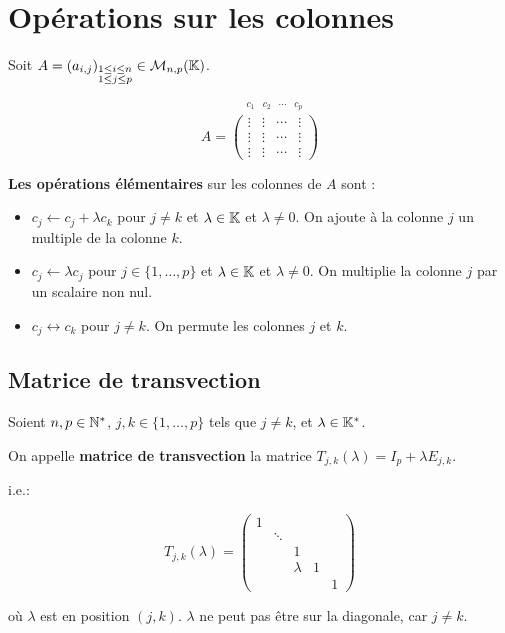 \documentclass[12pt, a4paper]{report}
\begin{document}
\section{Opérations sur les colonnes}

\begin{definition}
    Soit $A = (a_{i,j})_{\substack{1 \leq i \leq n \\ 1 \leq j \leq p}} \in \mathcal M_{n,p}(\mathbb{K})$.

    $$A = \overset{\begin{matrix}c_1 & c_2 & \cdots & c_p\end{matrix}}{\left(\begin{matrix} \vdots & \vdots & \cdots & \vdots \\ \vdots & \vdots & \cdots & \vdots \\ \vdots & \vdots & \cdots & \vdots \end{matrix}\right)}$$

    \textbf{Les opérations élémentaires} sur les colonnes de $A$ sont :
    
    \begin{itemize}
        \item $c_j \leftarrow c_j + \lambda c_k$ pour $j \ne k$ et $\lambda \in \mathbb{K}$ et $\lambda \ne 0$. On ajoute à la colonne $j$ un multiple de la colonne $k$.

        \item $c_j \leftarrow \lambda c_j$ pour $j \in \{1,\dots,p\}$ et $\lambda \in \mathbb{K}$ et $\lambda \ne 0$. On multiplie la colonne $j$ par un scalaire non nul.

        \item $c_j \leftrightarrow c_k$ pour $j \ne k$. On permute les colonnes $j$ et $k$.
    \end{itemize}
\end{definition}

\subsection{Matrice de transvection}

\begin{definition}
    Soient $n,p \in \mathbb{N}^*$, $j,k \in \{1,\dots,p\}$ tels que $j \ne k$, et $\lambda \in \mathbb{K}^*$.

    On appelle \textbf{matrice de transvection} la matrice $T_{j,k}(\lambda) = I_p + \lambda E_{j,k}$.

    i.e.:

    $$T_{j,k}(\lambda) = \left(\begin{matrix}
        1 & & & & \\
        & \ddots & & & \\
        & & 1 & & \\
        & & \lambda & 1 & \\
        & & & & 1
    \end{matrix}\right)$$

    où $\lambda$ est en position $(j,k)$. $\lambda$ ne peut pas être sur la diagonale, car $j \ne k$.
\end{definition}
\end{document}

